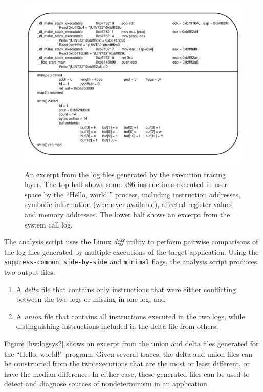 \begin{figure}[h]
  \center
  \includegraphics[scale=0.50, trim=2cm 2cm 2cm 0.5cm]{log.pdf}
  \caption[An excerpt from the log files generated by the execution tracing layer]%
          {An excerpt from the log files generated by the execution tracing layer.
          The top half shows some x86 instructions executed 
          in user-space by the ``Hello, world!'' process, including instruction addresses, 
          symbolic information (whenever available), affected register values and memory 
          addresses. The lower half shows an excerpt from the system call log.}
  \label{hw:logsys}
\end{figure}
\newpage
{} \newline
The analysis script uses the Linux \emph{diff} utility
to perform pairwise comparisons of the log files generated 
by multiple executions of the target application. 
Using the \texttt{suppress-common}, \texttt{side-by-side}
and \texttt{minimal} flags, the analysis script
produces two output files: 
\begin{enumerate}
\item A {\em delta} file
that contains only instructions that were 
either conflicting between the two logs or missing in one log, and
\item A {\em union} file that contains all instructions
executed in the two logs, while distinguishing instructions  
included in the delta file from others.
\end{enumerate}
Figure \ref{hw:logsys2} shows an excerpt from the 
union and delta files generated for the ``Hello, world!''
program. Given several traces, the delta and union
files can be constructed from the two
executions that are the most or least different, 
or have the median difference. In either case, these generated files can be used to
detect and diagnose sources of nondeterminism
in an application. 

